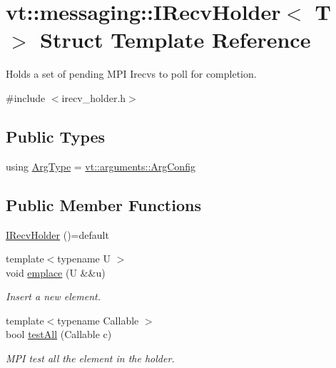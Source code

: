\hypertarget{structvt_1_1messaging_1_1_i_recv_holder}{}\section{vt\+:\+:messaging\+:\+:I\+Recv\+Holder$<$ T $>$ Struct Template Reference}
\label{structvt_1_1messaging_1_1_i_recv_holder}


Holds a set of pending M\+PI Irecvs to poll for completion.  




{\ttfamily \#include $<$irecv\+\_\+holder.\+h$>$}

\subsection*{Public Types}
\begin{DoxyCompactItemize}
\item 
using \hyperlink{structvt_1_1messaging_1_1_i_recv_holder_aae9327cb1e82d6aee682457739dad4b5}{Arg\+Type} = \hyperlink{structvt_1_1arguments_1_1_arg_config}{vt\+::arguments\+::\+Arg\+Config}
\end{DoxyCompactItemize}
\subsection*{Public Member Functions}
\begin{DoxyCompactItemize}
\item 
\hyperlink{structvt_1_1messaging_1_1_i_recv_holder_a709a349d723247b10bf57ca2831bfe19}{I\+Recv\+Holder} ()=default
\item 
{\footnotesize template$<$typename U $>$ }\\void \hyperlink{structvt_1_1messaging_1_1_i_recv_holder_ab81d251a84cb2c8366eb5f5052ce002c}{emplace} (U \&\&u)
\begin{DoxyCompactList}\small\item\em Insert a new element. \end{DoxyCompactList}\item 
{\footnotesize template$<$typename Callable $>$ }\\bool \hyperlink{structvt_1_1messaging_1_1_i_recv_holder_a5c25ae9371ef928b00c42405d9d00a38}{test\+All} (Callable c)
\begin{DoxyCompactList}\small\item\em M\+PI test all the element in the holder. \end{DoxyCompactList}\end{DoxyCompactItemize}


